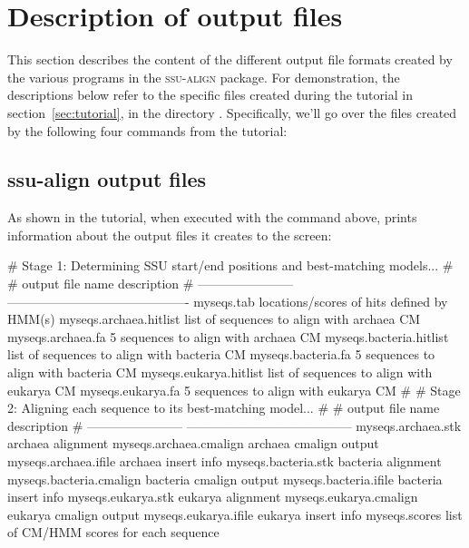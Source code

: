 \section{Description of output files}
\label{section:output}

This section describes the content of the different output file
formats created by the various programs in the \textsc{ssu-align}
package. For demonstration, the descriptions below refer to the
specific files created during the tutorial in
section~\ref{sec:tutorial}, in the directory . 
Specifically, we'll go over the files created by the following four
commands from the tutorial:




\subsection{ssu-align output files}

As shown in the tutorial, when executed with the command above,  
prints information about the output files it creates to the screen:

\begin{sreoutput}
# Stage 1: Determining SSU start/end positions and best-matching models...
#
# output file name         description                                
# -----------------------  -------------------------------------------
  myseqs.tab               locations/scores of hits defined by HMM(s)
  myseqs.archaea.hitlist   list of sequences to align with archaea CM
  myseqs.archaea.fa              5 sequences to align with archaea CM
  myseqs.bacteria.hitlist  list of sequences to align with bacteria CM
  myseqs.bacteria.fa             5 sequences to align with bacteria CM
  myseqs.eukarya.hitlist   list of sequences to align with eukarya CM
  myseqs.eukarya.fa              5 sequences to align with eukarya CM
#
# Stage 2: Aligning each sequence to its best-matching model...
#
# output file name         description
# -----------------------  ---------------------------------------
  myseqs.archaea.stk       archaea alignment
  myseqs.archaea.cmalign   archaea cmalign output
  myseqs.archaea.ifile     archaea insert info
  myseqs.bacteria.stk      bacteria alignment
  myseqs.bacteria.cmalign  bacteria cmalign output
  myseqs.bacteria.ifile    bacteria insert info
  myseqs.eukarya.stk       eukarya alignment
  myseqs.eukarya.cmalign   eukarya cmalign output
  myseqs.eukarya.ifile     eukarya insert info
  myseqs.scores            list of CM/HMM scores for each sequence
\end{sreoutput}

